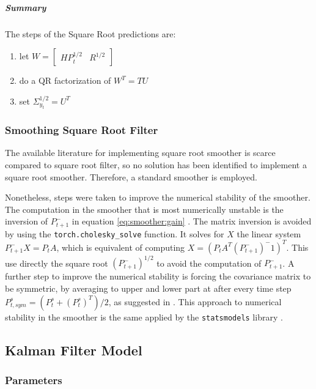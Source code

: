 \documentclass{article}
\let\Oldsubsection\subsection
\renewcommand{\subsection}{\FloatBarrier\Oldsubsection}
\begin{document}
\subparagraph{Summary} The steps of the Square Root predictions are:

\begin{enumerate}
    \item let  $W = \begin{bmatrix}HP_t^{1/2} & R^{1/2}\end{bmatrix}$
    \item do a QR factorization of $W^T=TU$
    \item set $\Sigma_{y_t}^{1/2} = U^T$
\end{enumerate}

\subsubsection{Smoothing Square Root Filter}

The available literature for implementing square root smoother is scarce compared to square root filter, so no solution has been identified to implement a square root smoother. Therefore, a standard smoother is employed.

Nonetheless, steps were taken to improve the numerical stability of the smoother. The computation in the smoother that is most numerically unstable is the inversion of $P^-_{t+1}$ in equation \ref{eq:smoother:gain} \cite{mohinder_s_grewal_kalman_2001}. The matrix inversion is avoided by using the \verb|torch.cholesky_solve| function. It solves for $X$ the linear system $P^-_{t+1}X=P_tA$, which is equivalent of computing $X = (P_tA^T(P^-_{t+1})^-1)^T$. This use directly the square root $(P^-_{t+1})^{1/2}$ to avoid the computation of $P^-_{t+1}$. A further step to improve the numerical stability is forcing the covariance matrix to be symmetric, by averaging to upper and lower part at after every time step $P^s_{t, sym} = (P^s_t + (P^s_t)^T)/2$, as suggested in \cite{dan_simon_optimal_2006}.
This approach to numerical stability in the smoother is the same applied by the \texttt{statsmodels} library \cite{noauthor_statsmodelstsastatespacekalman_filterkalmanfilter_nodate}.

\subsection{Kalman Filter Model}

\subsubsection{Parameters}
\end{document}
